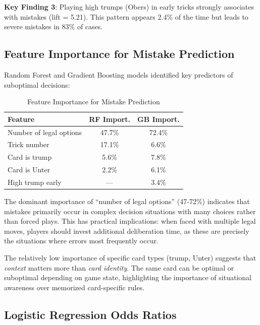\documentclass[conference]{IEEEtran}
\begin{document}
\textbf{Key Finding 3}: Playing high trumps (Obers) in early tricks strongly associates with mistakes (lift = 5.21). This pattern appears 2.4\% of the time but leads to severe mistakes in 83\% of cases.

\subsection{Feature Importance for Mistake Prediction}

Random Forest and Gradient Boosting models identified key predictors of suboptimal decisions:

\begin{table}[htbp]
\caption{Feature Importance for Mistake Prediction}
\begin{center}
\begin{tabular}{lcc}
\toprule
\textbf{Feature} & \textbf{RF Import.} & \textbf{GB Import.} \\
\midrule
Number of legal options & 47.7\% & 72.4\% \\
Trick number & 17.1\% & 6.6\% \\
Card is trump & 5.6\% & 7.8\% \\
Card is Unter & 2.2\% & 6.1\% \\
High trump early & — & 3.4\% \\
\bottomrule
\end{tabular}
\label{tab:feature_importance}
\end{center}
\end{table}

The dominant importance of ``number of legal options'' (47-72\%) indicates that mistakes primarily occur in complex decision situations with many choices rather than forced plays. This has practical implications: when faced with multiple legal moves, players should invest additional deliberation time, as these are precisely the situations where errors most frequently occur.

The relatively low importance of specific card types (trump, Unter) suggests that \textit{context} matters more than \textit{card identity}. The same card can be optimal or suboptimal depending on game state, highlighting the importance of situational awareness over memorized card-specific rules.

\subsection{Logistic Regression Odds Ratios}
\end{document}
